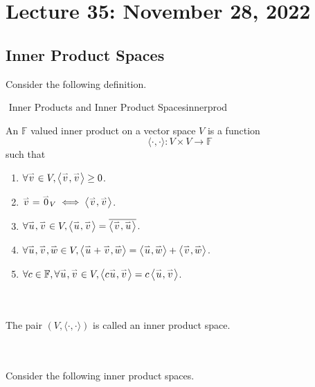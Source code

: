 \section{Lecture 35: November 28, 2022}

    \subsection{Inner Product Spaces}

        Consider the following definition.
        \begin{definition}{\Stop\,\,Inner Products and Inner Product Spaces}{innerprod}

            An \(\mathbb{F}\) valued inner product on a vector space \(V\) is a function 
            \begin{equation*}
                \langle\cdot,\cdot\rangle:V\times V\to \mathbb{F}
            \end{equation*}
            such that
            \begin{enumerate}
                \item \(\forall\vec{v}\in V,\iprod{\vec{v}}{\vec{v}}\geq 0\).
                \item \(\vec{v}=\vec{0}_V\iff\iprod{\vec{v}}{\vec{v}}\).
                \item \(\forall\vec{u},\vec{v}\in V,\iprod{\vec{u}}{\vec{v}}=\bar{\iprod{\vec{v}}{\vec{u}}}\).
                \item \(\forall\vec{u},\vec{v},\vec{w}\in V,\iprod{\vec{u}+\vec{v}}{\vec{w}}=\iprod{\vec{u}}{\vec{w}}+\iprod{\vec{v}}{\vec{w}}\).
                \item \(\forall c\in\mathbb{F},\forall\vec{u},\vec{v}\in V,\iprod{c\vec{u}}{\vec{v}}=c\iprod{\vec{u}}{\vec{v}}\).
            \end{enumerate}
            \vphantom
            \\
            \\
            The pair \((V,\langle\cdot,\cdot\rangle)\) is called an inner product space.
            
        \end{definition}
        \pagebreak
        \vphantom
        \\
        \\
        Consider the following inner product spaces.
